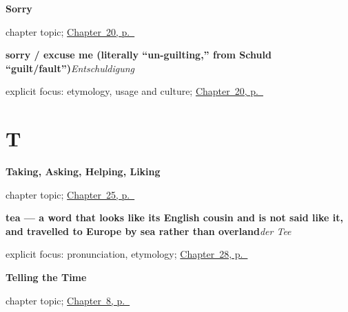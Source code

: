 \noindent\begin{minipage}[t]{\linewidth}
\raggedright
\textbf{Sorry}\par
\footnotesize chapter topic; \hyperref[ch:ge-sorry]{Chapter~20, p.~\pageref*{ch:ge-sorry}}
\end{minipage}\par\smallskip

\noindent\begin{minipage}[t]{\linewidth}
\raggedright
\textbf{sorry / excuse me (literally \textquotedblleft{}un-guilting,\textquotedblright{} from Schuld \textquotedblleft{}guilt/fault\textquotedblright{})}\enspace\emph{Entschuldigung}\par
\footnotesize explicit focus: etymology, usage and culture; \hyperref[ch:ge-sorry]{Chapter~20, p.~\pageref*{ch:ge-sorry}}
\end{minipage}\par\smallskip

\section*{T}

\noindent\begin{minipage}[t]{\linewidth}
\raggedright
\textbf{Taking, Asking, Helping, Liking}\par
\footnotesize chapter topic; \hyperref[ch:ge-doing-verbs]{Chapter~25, p.~\pageref*{ch:ge-doing-verbs}}
\end{minipage}\par\smallskip

\noindent\begin{minipage}[t]{\linewidth}
\raggedright
\textbf{tea — a word that looks like its English cousin and is not said like it, and travelled to Europe by sea rather than overland}\enspace\emph{der Tee}\par
\footnotesize explicit focus: pronunciation, etymology; \hyperref[ch:ge-coffee-tea-milk]{Chapter~28, p.~\pageref*{ch:ge-coffee-tea-milk}}
\end{minipage}\par\smallskip

\noindent\begin{minipage}[t]{\linewidth}
\raggedright
\textbf{Telling the Time}\par
\footnotesize chapter topic; \hyperref[ch:time]{Chapter~8, p.~\pageref*{ch:time}}
\end{minipage}\par\smallskip

